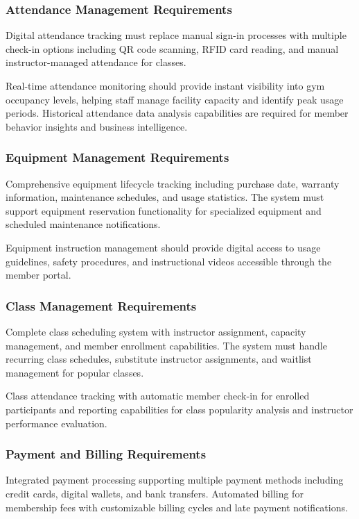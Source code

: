 \documentclass[12pt,a4paper]{report}
\begin{document}
\subsubsection{Attendance Management Requirements}

Digital attendance tracking must replace manual sign-in processes with multiple check-in options including QR code scanning, RFID card reading, and manual instructor-managed attendance for classes.

Real-time attendance monitoring should provide instant visibility into gym occupancy levels, helping staff manage facility capacity and identify peak usage periods. Historical attendance data analysis capabilities are required for member behavior insights and business intelligence.

\subsubsection{Equipment Management Requirements}

Comprehensive equipment lifecycle tracking including purchase date, warranty information, maintenance schedules, and usage statistics. The system must support equipment reservation functionality for specialized equipment and scheduled maintenance notifications.

Equipment instruction management should provide digital access to usage guidelines, safety procedures, and instructional videos accessible through the member portal.

\subsubsection{Class Management Requirements}

Complete class scheduling system with instructor assignment, capacity management, and member enrollment capabilities. The system must handle recurring class schedules, substitute instructor assignments, and waitlist management for popular classes.

Class attendance tracking with automatic member check-in for enrolled participants and reporting capabilities for class popularity analysis and instructor performance evaluation.

\subsubsection{Payment and Billing Requirements}

Integrated payment processing supporting multiple payment methods including credit cards, digital wallets, and bank transfers. Automated billing for membership fees with customizable billing cycles and late payment notifications.
\end{document}
